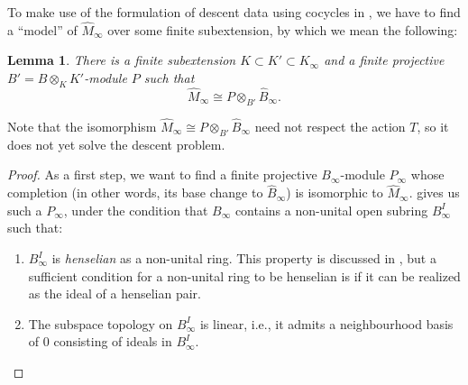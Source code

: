 \documentclass[10pt,twoside]{article}
\numberwithin{equation}{section}
\theoremstyle{plain}
\newtheorem{mylemma}[mythm]{Lemma}
\theoremstyle{definition}
\begin{document}
To make use of the formulation of descent data using cocycles in , we have to find a ``model'' of \(\hat M_\infty\) over some finite subextension, by which we mean the following:

\begin{mylemma}\label{SenFindingP}
    There is a finite subextension \(K\subset K'\subset K_\infty\) and a finite projective \(B'=B\otimes_K K'\)-module \(P\) such that
    \[\hat M_\infty\cong P\otimes_{B'} \hat B_{\infty}.\]
\end{mylemma}

Note that the isomorphism \(\hat M_\infty\cong P\otimes_{B'} \hat B_{\infty}\) need not respect the action \(T\), so it does not yet solve the descent problem.


\begin{proof}
As a first step, we want to find a finite projective \(B_\infty\)-module \(P_\infty\) whose completion (in other words, its base change to \(\hat B_\infty\)) is isomorphic to \(\hat M_\infty\). \cite[Corollary 2.1.22 (c)]{BC22} gives us such a \(P_\infty\), under the condition that \(B_\infty\) contains a non-unital open subring \(B_\infty^I\) such that: 
\begin{enumerate}
\item \(B_\infty^I\) is \emph{henselian} as a non-unital ring. This property is discussed in \cite[§2.1.1]{BC22}, but a sufficient condition for a non-unital ring to be henselian is if it can be realized as the ideal of a henselian pair.
\item The subspace topology on \(B_\infty^I\) is linear, i.e., it admits a neighbourhood basis of \(0\) consisting of ideals in \(B_\infty^I\).
\end{enumerate}


\end{proof}
\end{document}

